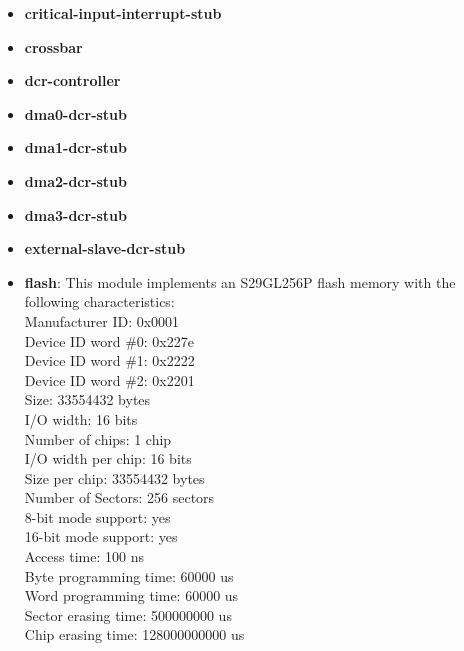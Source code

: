 \begin{itemize}
\item \textbf{critical-input-interrupt-stub}
\item \textbf{crossbar}
\item \textbf{dcr-controller}
\item \textbf{dma0-dcr-stub}
\item \textbf{dma1-dcr-stub}
\item \textbf{dma2-dcr-stub}
\item \textbf{dma3-dcr-stub}
\item \textbf{external-slave-dcr-stub}
\item \textbf{flash}: This module implements an S29GL256P flash memory with the following characteristics:\\
Manufacturer ID: 0x0001\\
Device ID word \#0: 0x227e\\
Device ID word \#1: 0x2222\\
Device ID word \#2: 0x2201\\
Size: 33554432 bytes\\
I/O width: 16 bits\\
Number of chips: 1 chip\\
I/O width per chip: 16 bits\\
Size per chip: 33554432 bytes\\
Number of Sectors: 256 sectors\\
8-bit mode support: yes\\
16-bit mode support: yes\\
Access time: 100 ns\\
Byte programming time: 60000 us\\
Word programming time: 60000 us\\
Sector erasing time: 500000000 us\\
Chip erasing time: 128000000000 us\\


\end{itemize}
